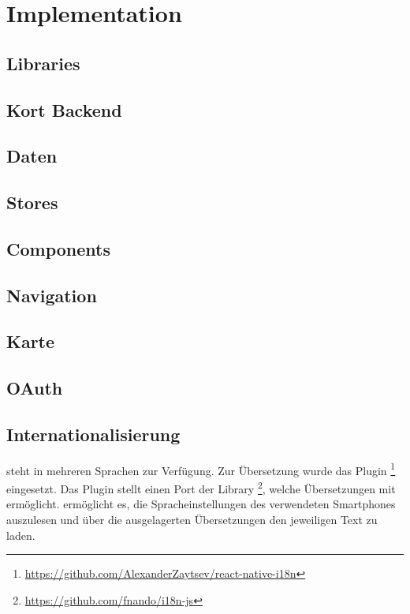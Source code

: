 \chapter{Implementation}
\label{pd-implementation}

\section{Libraries}


\section{Kort Backend}


\section{Daten}


\section{Stores}


\section{Components}


\section{Navigation}


\section{Karte}


\section{OAuth}


\section{Internationalisierung}
\kort{} steht in mehreren Sprachen zur Verfügung.
Zur Übersetzung wurde das Plugin \footnote{\url{https://github.com/AlexanderZaytsev/react-native-i18n}} eingesetzt.
Das Plugin stellt einen  Port der Library \footnote{\url{https://github.com/fnando/i18n-js}}, welche Übersetzungen mit  ermöglicht.\newline
{} ermöglicht es, die Spracheinstellungen des verwendeten Smartphones auszulesen und über die ausgelagerten Übersetzungen den jeweiligen Text zu laden.

